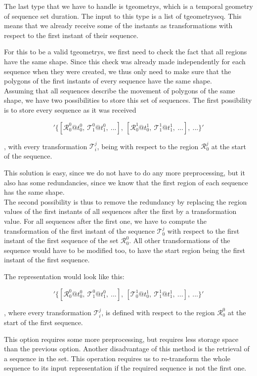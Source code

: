 The last type that we have to handle is tgeometrys, which is a temporal geometry of sequence set duration. The input to this type is a list of tgeometryseq. This means that we already receive some of the instants as transformations with respect to the first instant of their sequence.

For this to be a valid tgeometrys, we first need to check the fact that all regions have the same shape. Since this check was already made independently for each sequence when they were created, we thus only need to make sure that the polygons of the first instants of every sequence have the same shape. \\

Assuming that all sequences describe the movement of  polygons of the same shape, we have two possibilities to store this set of sequences. The first possibility is to store every sequence as it was received

\[
    '\{[\mathcal{R}_0^0@t_0^0,\ \mathcal{T}_1^0@t_1^0,\ ...],\ [\mathcal{R}_0^1@t_0^1,\ \mathcal{T}_1^1@t_1^1,\ ...],\ ...\}'
\]

, with every transformation $\mathcal{T}_i^j$, being with respect to the region $\mathcal{R}_0^j$ at the start of the sequence.

This solution is easy, since we do not have to do any more preprocessing, but it also has some redundancies, since we know that the first region of each sequence has the same shape. \\

The second possibility is thus to remove the redundancy by replacing the region values of the first instants of all sequences after the first by a transformation value. For all sequences after the first one, we have to compute the transformation of the first instant of the sequence $\mathcal{T}_0^j$ with respect to the first instant of the first sequence of the set $\mathcal{R}_0^0$. All other transformations of the sequence would have to be modified too, to have the start region being the first instant of the first sequence.

The representation would look like this:

\[
    '\{[\mathcal{R}_0^0@t_0^0,\ \mathcal{T}_1^0@t_1^0,\ ...],\ [\mathcal{T}_0^1@t_0^1,\ \mathcal{T}_1^1@t_1^1,\ ...],\ ...\}'
\]

, where every transformation $\mathcal{T}_i^j$, is defined with respect to the region $\mathcal{R}_0^0$ at the start of the first sequence.

This option requires some more preprocessing, but requires less storage space than the previous option. Another disadvantage of this method is the retrieval of a sequence in the set. This operation requires us to re-transform the whole sequence to its input representation if the required sequence is not the first one.

